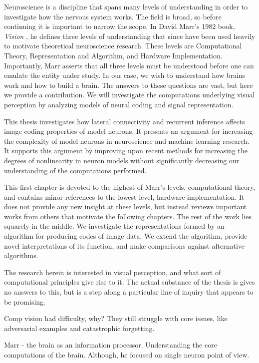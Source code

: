 Neuroscience is a discipline that spans many levels of understanding in order to investigate how the nervous system works. The field is broad, so before continuing it is important to narrow the scope. In David Marr's 1982 book, \textit{Vision} \cite{marr1982vision}, he defines three levels of understanding that since have been used heavily to motivate theoretical neuroscience research. These levels are Computational Theory, Representation and Algorithm, and Hardware Implementation. Importantly, Marr asserts that all three levels must be understood before one can emulate the entity under study. In our case, we wish to understand how brains work and how to build a brain. The answers to these questions are vast, but here we provide a contribution. We will investigate the computations underlying visual perception by analyzing models of neural coding and signal representation.

This thesis investigates how lateral connectivity and recurrent inference affects image coding properties of model neurons. It presents an argument for increasing the complexity of model neurons in neuroscience and machine learning research. It supports this argument by improving upon recent methods for increasing the degrees of nonlinearity in neuron models without significantly decreasing our understanding of the computations performed.

This first chapter is devoted to the highest of Marr's levels, computational theory, and contains minor references to the lowest level, hardware implementation. It does not provide any new insight at these levels, but instead reviews important works from others that motivate the following chapters. The rest of the work lies squarely in the middle. We investigate the representations formed by an algorithm for producing codes of image data. We extend the algorithm, provide novel interpretations of its function, and make comparisons against alternative algorithms.

The research herein is interested in visual perception, and what sort of computational principles give rise to it. The actual substance of the thesis is gives no answers to this, but is a step along a particular line of inquiry that appears to be promising.

Comp vision had difficulty, why? They still struggle with core issues, like adversarial examples and catastrophic forgetting.

Marr - the brain as an information processor. Understanding the core computations of the brain. Although, he focused on single neuron point of view.

